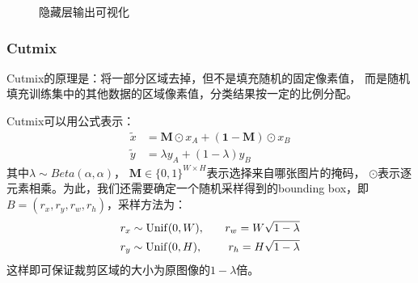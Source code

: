 \documentclass[UTF8]{ctexart}
\begin{document}
\begin{figure}[h]
    \centering
    \hspace{0.5in}
    \hspace{0.5in}
    \hspace{0.5in}
    \hspace{0.5in}
    \hspace{0.5in}
    \caption{隐藏层输出可视化}
\end{figure}

\subsubsection{Cutmix}
Cutmix的原理是：将一部分区域去掉，但不是填充随机的固定像素值，
而是随机填充训练集中的其他数据的区域像素值，分类结果按一定的比例分配。

Cutmix可以用公式表示：
$$\begin{aligned}
    \tilde{x} &= \textbf{M} \odot x_A + (\textbf{1}-\textbf{M}) \odot x_B \\
    \tilde{y} &= \lambda y_A + (1-\lambda) y_B
\end{aligned}$$
其中$\lambda\sim Beta(\alpha, \alpha)$，
$\textbf{M}\in\{0,1\}^{W\times H}$表示选择来自哪张图片的掩码，
$\odot$表示逐元素相乘。为此，我们还需要确定一个随机采样得到的bounding box，即
$B=(r_x,r_y,r_w,r_h)$，采样方法为：
$$\begin{aligned}
    & r_x \sim {\rm Unif}(0, W), & \quad r_w=W\sqrt{1-\lambda} \\
    & r_y \sim {\rm Unif}(0, H), & \quad r_h=H\sqrt{1-\lambda}
\end{aligned}$$
这样即可保证裁剪区域的大小为原图像的$1-\lambda$倍。
\end{document}
